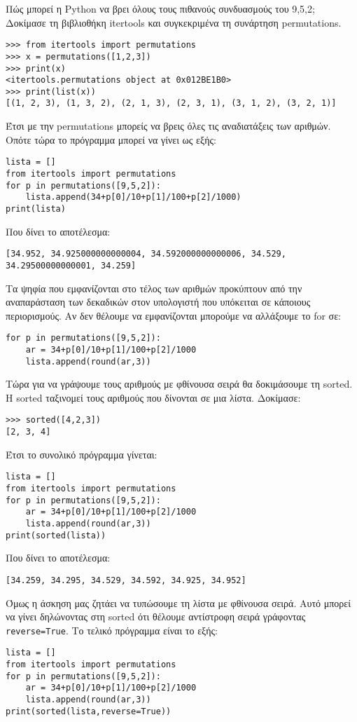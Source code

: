 Πώς μπορεί η Python να βρει όλους τους πιθανούς συνδυασμούς του 9,5,2;
Δοκίμασε τη βιβλιοθήκη itertools και συγκεκριμένα τη συνάρτηση permutations.
\begin{lstlisting}
>>> from itertools import permutations
>>> x = permutations([1,2,3])
>>> print(x)
<itertools.permutations object at 0x012BE1B0>
>>> print(list(x))
[(1, 2, 3), (1, 3, 2), (2, 1, 3), (2, 3, 1), (3, 1, 2), (3, 2, 1)]
\end{lstlisting}
Έτσι με την permutations μπορείς να βρεις όλες τις αναδιατάξεις των αριθμών. Οπότε τώρα το πρόγραμμα μπορεί να γίνει ως εξής:
\begin{lstlisting}
lista = []
from itertools import permutations
for p in permutations([9,5,2]):
    lista.append(34+p[0]/10+p[1]/100+p[2]/1000)
print(lista)
\end{lstlisting}
Που δίνει το αποτέλεσμα:
\begin{lstlisting}
[34.952, 34.925000000000004, 34.592000000000006, 34.529, 
34.29500000000001, 34.259]
\end{lstlisting}
Τα ψηφία που εμφανίζονται στο τέλος των αριθμών προκύπτουν από την αναπαράσταση των δεκαδικών στον υπολογιστή που υπόκειται σε κάποιους περιορισμούς.
Αν δεν θέλουμε να εμφανίζονται μπορούμε να αλλάξουμε το for σε:
\begin{lstlisting}
for p in permutations([9,5,2]):
    ar = 34+p[0]/10+p[1]/100+p[2]/1000
    lista.append(round(ar,3))
\end{lstlisting}
Τώρα για να γράψουμε τους αριθμούς με φθίνουσα σειρά θα δοκιμάσουμε τη sorted. Η sorted ταξινομεί τους αριθμούς που δίνονται σε μια λίστα. Δοκίμασε:
\begin{lstlisting}
>>> sorted([4,2,3])
[2, 3, 4]
\end{lstlisting}
Έτσι το συνολικό πρόγραμμα γίνεται:
\begin{lstlisting}
lista = []
from itertools import permutations
for p in permutations([9,5,2]):
    ar = 34+p[0]/10+p[1]/100+p[2]/1000
    lista.append(round(ar,3))
print(sorted(lista))
\end{lstlisting}

Που δίνει το αποτέλεσμα:
\begin{lstlisting}
[34.259, 34.295, 34.529, 34.592, 34.925, 34.952]
\end{lstlisting}

Όμως η άσκηση μας ζητάει να τυπώσουμε τη λίστα με φθίνουσα σειρά. Αυτό μπορεί να γίνει δηλώνοντας στη sorted ότι θέλουμε αντίστροφη σειρά γράφοντας \lstinline{reverse=True}. Το τελικό πρόγραμμα είναι το εξής:
\begin{lstlisting}
lista = []
from itertools import permutations
for p in permutations([9,5,2]):
    ar = 34+p[0]/10+p[1]/100+p[2]/1000
    lista.append(round(ar,3))
print(sorted(lista,reverse=True))
\end{lstlisting}

